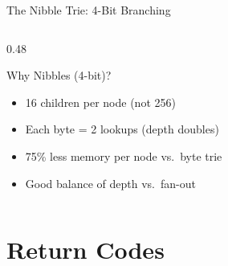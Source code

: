 \documentclass[aspectratio=169, 10pt]{beamer}
\begin{document}
\begin{frame}[fragile]{The Nibble Trie: 4-Bit Branching}
\begin{columns}[T]
\begin{column}{0.48\textwidth}
\begin{center}
\end{center}

\vspace{0.3em}
\begin{block}{Why Nibbles (4-bit)?}
\begin{itemize}
  \item 16 children per node (not 256)
  \item Each byte = 2 lookups (depth doubles)
  \item 75\% less memory per node vs.\ byte trie
  \item Good balance of depth vs.\ fan-out
\end{itemize}
\end{block}
\end{column}
\end{columns}
\end{frame}

\section{Return Codes}
\end{document}
